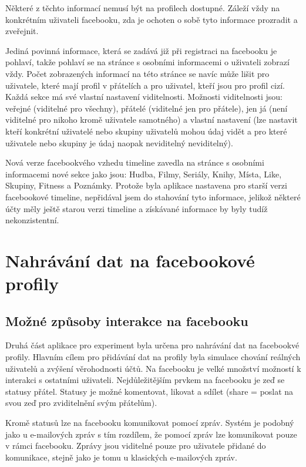 \documentclass[thesis=M,czech]{FITthesis}[2013/05/10]
\begin{document}
Některé z těchto informací nemusí být na profilech dostupné. Záleží vždy na konkrétním uživateli facebooku, zda je ochoten o sobě tyto informace prozradit a zveřejnit.

Jediná povinná informace, která se zadává již při registraci na facebooku je pohlaví, takže pohlaví se na stránce s osobními informacemi o uživateli zobrazí vždy. Počet zobrazených informací na této stránce se navíc může lišit pro uživatele, které mají profil v přátelích a pro uživatel, kteří jsou pro profil cizí. Každá sekce má své vlastní nastavení viditelnosti. Možnosti viditelnosti jsou: veřejné (viditelné pro všechny), přátelé (viditelné jen pro přátele), jen já (není viditelné pro nikoho kromě uživatele samotného) a vlastní nastavení (lze nastavit kteří konkrétní uživatelé nebo skupiny uživatelů mohou údaj vidět a pro které uživatele nebo skupiny je údaj naopak neviditelný neviditelný).

Nová verze facebookvého vzhedu timeline zavedla na stránce s osobními informacemi nové sekce jako jsou: Hudba, Filmy, Seriály, Knihy, Místa, Like, Skupiny, Fitness a Poznámky. Protože byla aplikace nastavena pro starší verzi facebookové timeline, nepřidával jsem do stahování tyto informace, jelikož některé účty měly ještě starou verzi timeline a získávané informace by byly tudíž nekonzistentní.

\section{Nahrávání dat na facebookové profily}

\subsection{Možné způsoby interakce na facebooku}

Druhá část aplikace pro experiment byla určena pro nahrávání dat na facebookvé profily. Hlavním cílem pro přidávání dat na profily byla simulace chování reálných uživatelů a zvýšení věrohodnosti účtů. Na facebooku je velké množství možností k interakci s ostatními uživateli. Nejdůležitějším prvkem na facebooku je zeď se statusy přátel. Statusy je možné komentovat, likovat a sdílet (share = poslat na svou zeď pro zviditelnění svým přátelům). 

Kromě statusů lze na facebooku komunikovat pomocí zpráv. Systém je podobný jako u e-mailových zpráv s tím rozdílem, že pomocí zpráv lze komunikovat pouze  v rámci facebooku. Zprávy jsou viditelné pouze pro uživatele přidané do komunikace, stejně jako je tomu u klasických e-mailových zpráv. 
\end{document}
